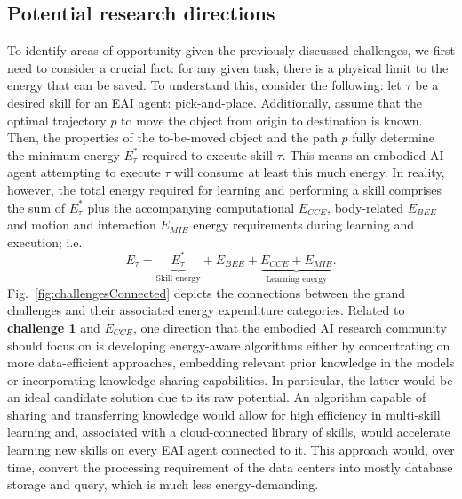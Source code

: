 \subsection{Potential research directions}
To identify areas of opportunity given the previously discussed challenges, we first need to consider a crucial fact: for any given task, there is a physical limit to the energy that can be saved. To understand this, consider the following: let $\tau$ be a desired skill for an EAI agent: pick-and-place. Additionally, assume that the optimal trajectory $p$ to move the object from origin to destination is known. Then, the properties of the to-be-moved object and the path $p$ fully determine the minimum energy $E^*_{\tau}$ required to execute skill $\tau$. This means an embodied AI agent attempting to execute $\tau$ will consume at least this much energy. In reality, however, the total energy required for learning and performing a skill comprises the sum of $E^*_{\tau}$ plus the accompanying computational $E_{CCE}$, body-related $E_{BEE}$ and motion and interaction $E_{MIE}$ energy requirements during learning and execution; i.e.
\begin{equation}
	E_{\tau} =  \underbrace{E^*_{\tau}}_{\text{Skill energy}} + E_{BEE} + \underbrace{E_{CCE} + E_{MIE}}_{\text{Learning energy}}.
\end{equation}
Fig.~\ref{fig:challengesConnected} depicts the connections between the grand challenges and their associated energy expenditure categories. Related to \textbf{challenge 1} and $E_{CCE}$, one direction that the embodied AI research community should focus on is developing energy-aware algorithms either by concentrating on more data-efficient approaches, embedding relevant prior knowledge in the models or incorporating knowledge sharing capabilities. In particular, the latter would be an ideal candidate solution due to its raw potential. An algorithm capable of sharing and transferring knowledge would allow for high efficiency in multi-skill learning and, associated with a cloud-connected library of skills, would accelerate learning new skills on every EAI agent connected to it. This approach would, over time, convert the processing requirement of the data centers into mostly database storage and query, which is much less energy-demanding.

